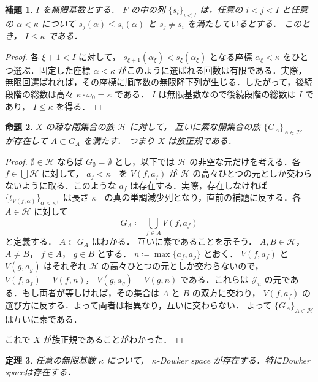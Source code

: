 \documentclass[leqno, 12pt]{ltjsarticle}
\newtheorem{thm}{定理}
\newtheorem{prop}[thm]{命題}
\newtheorem{lem}[thm]{補題}
\newcommand{\kappasucc}{\kappa^{+}}
\newcommand{\omegazero}{\omega_{0}}
\begin{document}
\begin{lem}
$I$
を無限基数とする．
$F$
の中の列
$\{s_{i}\}_{i<I}$
は，任意の
$i<j<I$
と任意の
$\alpha<\kappa$
について
$s_{j}(\alpha)\le s_{i}(\alpha)$
と
$s_{j}\neq s_{i}$
を満たしているとする．
このとき，
$I\le \kappa$
である．
\end{lem}
\begin{proof}
各
$\xi+1<I$
に対して，
$s_{\xi+1}(\alpha_{\xi})<s_{\xi}(\alpha_{\xi})$
となる座標
$\alpha_{\xi}<\kappa$
をひとつ選ぶ．固定した座標
$\alpha<\kappa$
がこのように選ばれる回数は有限である．実際，無限回選ばれれば，その座標に順序数の無限降下列が生じる．したがって，後続段階の総数は高々
$\kappa\cdot\omegazero=\kappa$
である．
$I$
は無限基数なので後続段階の総数は
$I$
であり，
$I\le\kappa$
を得る．
\end{proof}

\begin{prop}
$X$
の疎な閉集合の族
$\mathcal{H}$
に対して，
互いに素な開集合の族
$\{G_{A}\}_{A\in \mathcal{H}}$
が存在して
$A\subset G_{A}$
を満たす．
つまり
$X$
は族正規である．
\end{prop}
\begin{proof}
$\emptyset\in\mathcal{H}$
ならば
$G_{\emptyset}=\emptyset$
とし，以下では
$\mathcal{H}$
の非空な元だけを考える．各
$f\in\bigcup\mathcal{H}$
に対して，
$a_{f}< \kappasucc$
を
$V(f,a_{f})$
が
$\mathcal{H}$
の高々ひとつの元としか交わらないように取る．このような
$a_{f}$
は存在する．実際，存在しなければ
$\{t_{V(f,\alpha)}\}_{\alpha<\kappasucc}$
は長さ
$\kappasucc$
の真の単調減少列となり，直前の補題に反する．各
$A\in\mathcal{H}$
に対して
\[
G_{A}\coloneqq\bigcup_{f\in A}V(f,a_{f})
\]
と定義する．
$A\subset G_{A}$
はわかる．
互いに素であることを示そう．
$A,B\in\mathcal{H}$，
$A\neq B$，
$f\in A$，
$g\in B$
とする．
$n\coloneqq\max\{a_{f}, a_{g}\}$
とおく．
$V(f,a_{f})$
と
$V(g,a_{g})$
はそれぞれ
$\mathcal{H}$
の高々ひとつの元としか交わらないので，
$V(f,a_{f})=V(f,n)$，
$V(g, a_{g})=V(g,n)$
である．これらは
$\mathcal{J}_{n}$
の元である．もし両者が等しければ，その集合は
$A$
と
$B$
の双方に交わり，
$V(f,a_{f})$
の選び方に反する．よって両者は相異なり，互いに交わらない．
よって
$\{G_{A}\}_{A\in\mathcal{H}}$
は互いに素である．

これで
$X$
が族正規であることがわかった．

\end{proof}



\begin{thm}
任意の無限基数
$\kappa$
について，
$\kappa$-Dowker space
が存在する．特にDowker spaceは存在する．
\end{thm}
\end{document}

